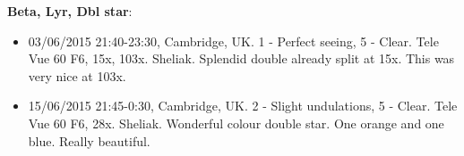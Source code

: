 {\bf Beta, Lyr, Dbl star}:
\begin{itemize}
\item 03/06/2015 21:40-23:30, Cambridge, UK. 1 - Perfect seeing, 5 - Clear. Tele Vue 60 F6, 15x, 103x. Sheliak. Splendid double already split at 15x. This was very nice at 103x. 
\item 15/06/2015 21:45-0:30, Cambridge, UK. 2 - Slight undulations, 5 - Clear. Tele Vue 60 F6, 28x. Sheliak. Wonderful colour double star. One orange and one blue. Really beautiful.
\end{itemize}

